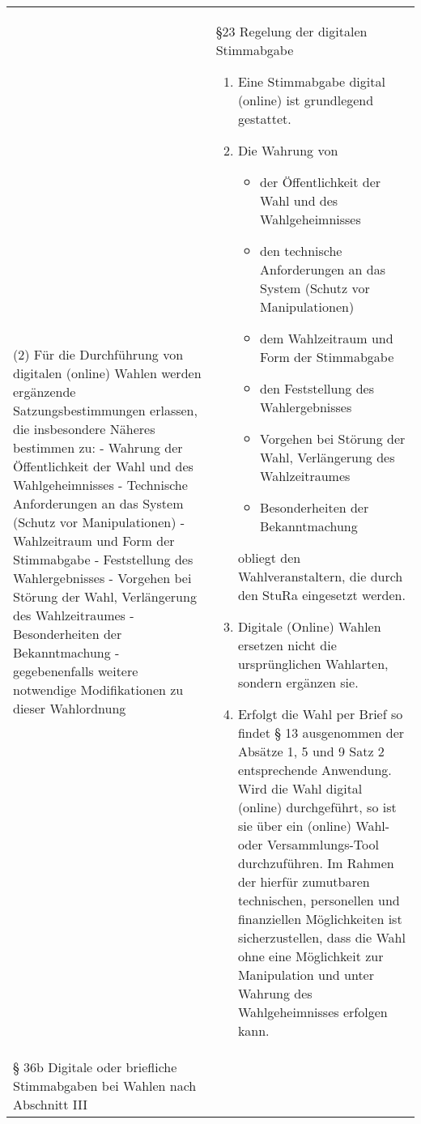 {\begin{longtable}{|p{7.5cm}|p{7.5cm}|}
        (2) Für die Durchführung von digitalen (online) Wahlen werden ergänzende Satzungsbestimmungen erlassen, die insbesondere Näheres bestimmen zu: - Wahrung der Öffentlichkeit der Wahl und des Wahlgeheimnisses - Technische Anforderungen an das System (Schutz vor Manipulationen) - Wahlzeitraum und Form der Stimmabgabe - Feststellung des Wahlergebnisses - Vorgehen bei Störung der Wahl, Verlängerung des Wahlzeitraumes - Besonderheiten der Bekanntmachung - gegebenenfalls weitere notwendige Modifikationen zu dieser Wahlordnung\newline
    &
        §23 Regelung der digitalen Stimmabgabe
        \begin{enumerate}
            \item Eine Stimmabgabe digital (online) ist grundlegend gestattet.
            \item {Die Wahrung von
                \begin{itemize}
                    \item der Öffentlichkeit der Wahl und des Wahlgeheimnisses
                    \item den technische Anforderungen an das System (Schutz vor Manipulationen)
                    \item dem Wahlzeitraum und Form der Stimmabgabe
                    \item den Feststellung des Wahlergebnisses
                    \item Vorgehen bei Störung der Wahl, Verlängerung des Wahlzeitraumes
                    \item Besonderheiten der Bekanntmachung
                \end{itemize}
                obliegt den Wahlveranstaltern, die durch den StuRa eingesetzt werden.}
            \item Digitale (Online) Wahlen ersetzen nicht die ursprünglichen Wahlarten, sondern ergänzen sie.
            \item Erfolgt die Wahl per Brief so findet § 13 ausgenommen der Absätze 1, 5 und 9 Satz 2 entsprechende Anwendung. Wird die Wahl digital (online) durchgeführt, so ist sie über ein (online) Wahl-oder Versammlungs-Tool durchzuführen. Im Rahmen der hierfür zumutbaren technischen, personellen und finanziellen Möglichkeiten ist sicherzustellen, dass die Wahl ohne eine Möglichkeit zur Manipulation und unter Wahrung des Wahlgeheimnisses erfolgen kann.
        \end{enumerate} \\
        § 36b Digitale oder briefliche Stimmabgaben bei Wahlen nach Abschnitt III\newline

\end{longtable}}
